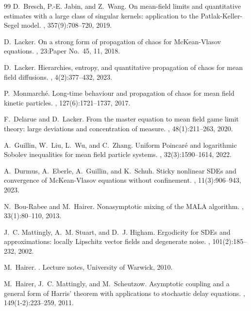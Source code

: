 \documentclass[11pt]{article}
\theoremstyle{definition}
\begin{document}
\begin{thebibliography}{99}
D.~Bresch, P.-E. Jabin, and Z.~Wang.
\newblock On mean-field limits and quantitative estimates with a large class of singular kernels: application to the {P}atlak-{K}eller-{S}egel model.
, 357(9):708--720, 2019.

D.~Lacker.
\newblock On a strong form of propagation of chaos for {M}c{K}ean-{V}lasov equations.
, 23:Paper No.~45, 11, 2018.

D.~Lacker.
\newblock Hierarchies, entropy, and quantitative propagation of chaos for mean field diffusions.
, 4(2):377--432, 2023.

P.~Monmarch\'e.
\newblock Long-time behaviour and propagation of chaos for mean field kinetic particles.
, 127(6):1721--1737, 2017.

F.~Delarue and D.~Lacker.
\newblock From the master equation to mean field game limit theory: large deviations and concentration of measure.
, 48(1):211--263, 2020.

A.~Guillin, W.~Liu, L.~Wu, and C.~Zhang.
\newblock Uniform {P}oincar\'e and logarithmic {S}obolev inequalities for mean field particle systems.
, 32(3):1590--1614, 2022.

A.~Durmus, A.~Eberle, A.~Guillin, and K.~Schuh.
\newblock Sticky nonlinear {SDE}s and convergence of {M}c{K}ean-{V}lasov equations without confinement.
, 11(3):906--943, 2023.

N.~Bou-Rabee and M.~Hairer.
\newblock Nonasymptotic mixing of the {MALA} algorithm.
, 33(1):80--110, 2013.

J.~C. Mattingly, A.~M. Stuart, and D.~J. Higham.
\newblock Ergodicity for {SDE}s and approximations: locally {L}ipschitz vector fields and degenerate noise.
, 101(2):185--232, 2002.

M.~Hairer.
.
\newblock Lecture notes, University of Warwick, 2010.

M.~Hairer, J.~C. Mattingly, and M.~Scheutzow.
\newblock Asymptotic coupling and a general form of {H}arris' theorem with applications to stochastic delay equations.
, 149(1-2):223--259, 2011.


\end{thebibliography}
\end{document}
